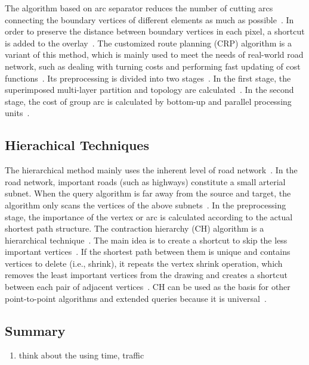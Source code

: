 \documentclass[conference]{IEEEtran}
\begin{document}
The algorithm based on arc separator reduces the number of cutting arcs connecting the boundary vertices of different elements as much as possible~\cite{bast2016route}. In order to preserve the distance between boundary vertices in each pixel, a shortcut is added to the overlay~\cite{bast2016route}. The customized route planning (CRP) algorithm is a variant of this method, which is mainly used to meet the needs of real-world road network, such as dealing with turning costs and performing fast updating of cost functions~\cite{delling2017customizable}. Its preprocessing is divided into two stages~\cite{delling2017customizable}. In the first stage, the superimposed multi-layer partition and topology are calculated~\cite{delling2017customizable}. In the second stage, the cost of group arc is calculated by bottom-up and parallel processing units~\cite{delling2017customizable}.

\subsection{Hierachical Techniques}
The hierarchical method mainly uses the inherent level of road network~\cite{bast2016route}. In the road network, important roads (such as highways) constitute a small arterial subnet. When the query algorithm is far away from the source and target, the algorithm only scans the vertices of the above subnets~\cite{bast2016route}. In the preprocessing stage, the importance of the vertex or arc is calculated according to the actual shortest path structure. The contraction hierarchy (CH) algorithm is a hierarchical technique~\cite{geisberger2012exact}. The main idea is to create a shortcut to skip the less important vertices~\cite{geisberger2012exact}. If the shortest path between them is unique and contains vertices to delete (i.e., shrink), it repeats the vertex shrink operation, which removes the least important vertices from the drawing and creates a shortcut between each pair of adjacent vertices~\cite{geisberger2012exact}. CH can be used as the basis for other point-to-point algorithms and extended queries because it is universal~\cite{geisberger2012exact}.


\subsection{Summary}
\begin{enumerate}
	\item think about the using time, traffic
\end{enumerate}
\end{document}
